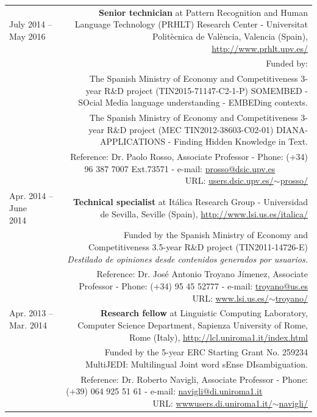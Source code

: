 \documentclass[10pt]{article}
\begin{document}
\begin{tabular}{L!{\VRule}R}
July 2014 -- May 2016 ~~&{\textbf{Senior technician} at Pattern Recognition and Human Language Technology (PRHLT) Research Center - Universitat Polit{\`e}cnica de Val{\`e}ncia, Valencia (Spain),
\url{http://www.prhlt.upv.es/}}\\
&\scriptsize{Funded by:}\\
&\scriptsize{\textcolor{white}{ssss}The Spanish Ministry of Economy and Competitiveness 3-year R\&D project (TIN2015-71147-C2-1-P) SOMEMBED - SOcial Media language 
understanding - EMBEDing contexts.}\\
&\scriptsize{\textcolor{white}{ssss}The Spanish Ministry of Economy and Competitiveness 3-year R\&D project (MEC TIN2012-38603-C02-01) DIANA-APPLICATIONS - Finding Hidden Knowledge 
in Text.}\\
&\scriptsize{Reference: Dr. Paolo Rosso, Associate Professor - Phone: (+34) 96 387 7007 Ext.73571 - e-mail: \href{mailto:prosso@dsic.upv.es}{prosso@dsic.upv.es} ~~~~~~~ URL: \href{http://users.dsic.upv.es/~prosso/}{users.dsic.upv.es/$\sim$prosso/}}\\

Apr. 2014 -- June 2014~~~~&{\textbf{Technical specialist} at It{\'a}lica Research Group - Universidad de Sevilla, Seville (Spain), 
\url{http://www.lsi.us.es/italica/}}\\
&\scriptsize{Funded by the Spanish Ministry of Economy and Competitiveness 3.5-year R\&D project (TIN2011-14726-E) \emph{Destilado de opiniones desde contenidos generados por 
usuarios.}}\\
&\scriptsize{Reference: Dr. Jos{\'e} Antonio Troyano J{\'i}menez, Associate Professor - Phone: (+34) 95 45 52777 - e-mail: \href{mailto:troyano@us.es}{troyano@us.es} ~~~~~~~ URL: \href{http://www.lsi.us.es/~troyano/}{www.lsi.us.es/$\sim$troyano/}}\\
 
Apr. 2013 -- Mar. 2014 ~~&{\textbf{Research fellow} at Linguistic Computing Laboratory, Computer Science Department, Sapienza University of Rome, Rome (Italy), \url{http://lcl.uniroma1.it/index.html}}\\
&\scriptsize{Funded by the 5-year ERC Starting Grant No. 259234 MultiJEDI: Multilingual Joint word sEnse DIsambiguation.}\\
&\scriptsize{Reference: Dr. Roberto Navigli, Associate Professor - Phone: (+39) 064 925 51 61 - e-mail: \href{mailto:navigli@di.uniroma1.it}{navigli@di.uniroma1.it} ~~~~~~~~~~ URL: \href{http://wwwusers.di.uniroma1.it/~navigli/}{wwwusers.di.uniroma1.it/$\sim$navigli/}}\\


\end{tabular}
\end{document}
